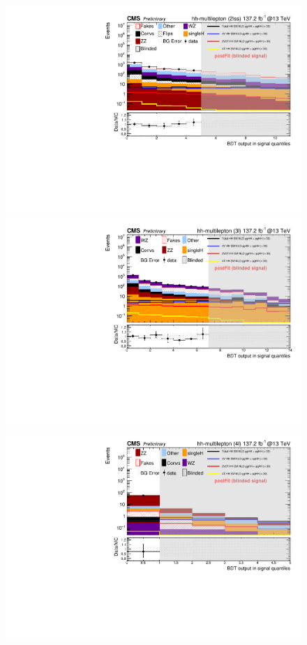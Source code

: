 \begin{figure}
  \centering\includegraphics[width=\cmsFigWidth]{figures/postFitPlots/2lss.pdf}
  \centering\includegraphics[width=\cmsFigWidth]{figures/postFitPlots/3l.pdf}
  \centering\includegraphics[width=\cmsFigWidth]{figures/postFitPlots/4l.pdf}

\end{figure}
